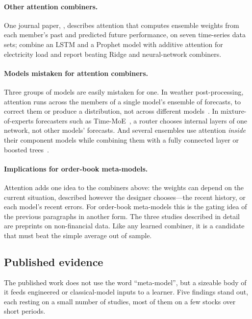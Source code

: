 \paragraph{Other attention combiners.} One journal paper, \citet{yao2026asde}, describes attention that computes
ensemble weights from each member's past and predicted future performance, on seven time-series data sets;
\citet{chen2024attnensload} combine an LSTM and a Prophet model with additive attention for electricity load
and report beating Ridge and neural-network combiners.

\paragraph{Models mistaken for attention combiners.} Three groups of models are easily mistaken for one.
In weather post-processing, attention runs across the members of a single model's ensemble of forecasts, to
correct them or produce a distribution, not across different models~\citep{finn2021saet,benbouallegue2024poet}.
In mixture-of-experts forecasters such as Time-MoE~\citep{shi2025timemoe}, a router chooses internal layers of
one network, not other models' forecasts. And several ensembles use attention \emph{inside} their component
models while combining them with a fully connected layer or boosted trees~\citep{bui2025haelt}.

\paragraph{Implications for order-book meta-models.} Attention adds one idea to the combiners above: the weights can depend on
the current situation, described however the designer chooses---the recent history, or each model's recent
errors. For order-book meta-models this is the gating idea of the previous paragraphs in another form. The
three studies described in detail are preprints on non-financial data. Like any learned combiner, it is a
candidate that must beat the simple average out of sample.

\subsection{Published evidence}
\label{sec:meta-evidence}

The published work does not use the word ``meta-model'', but a sizeable body of it feeds engineered or
classical-model inputs to a learner. Five findings stand out, each resting on a small number of studies,
most of them on a few stocks over short periods.

